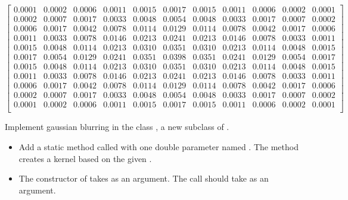 \documentclass{book}
\begin{document}
{\footnotesize{$$
\begin{bmatrix}
0.0001 & 0.0002 & 0.0006 & 0.0011 & 0.0015 & 0.0017 & 0.0015 & 0.0011 & 0.0006 & 0.0002 & 0.0001\\
0.0002 & 0.0007 & 0.0017 & 0.0033 & 0.0048 & 0.0054 & 0.0048 & 0.0033 & 0.0017 & 0.0007 & 0.0002\\
0.0006 & 0.0017 & 0.0042 & 0.0078 & 0.0114 & 0.0129 & 0.0114 & 0.0078 & 0.0042 & 0.0017 & 0.0006\\
0.0011 & 0.0033 & 0.0078 & 0.0146 & 0.0213 & 0.0241 & 0.0213 & 0.0146 & 0.0078 & 0.0033 & 0.0011\\
0.0015 & 0.0048 & 0.0114 & 0.0213 & 0.0310 & 0.0351 & 0.0310 & 0.0213 & 0.0114 & 0.0048 & 0.0015\\
0.0017 & 0.0054 & 0.0129 & 0.0241 & 0.0351 & 0.0398 & 0.0351 & 0.0241 & 0.0129 & 0.0054 & 0.0017\\
0.0015 & 0.0048 & 0.0114 & 0.0213 & 0.0310 & 0.0351 & 0.0310 & 0.0213 & 0.0114 & 0.0048 & 0.0015\\
0.0011 & 0.0033 & 0.0078 & 0.0146 & 0.0213 & 0.0241 & 0.0213 & 0.0146 & 0.0078 & 0.0033 & 0.0011\\
0.0006 & 0.0017 & 0.0042 & 0.0078 & 0.0114 & 0.0129 & 0.0114 & 0.0078 & 0.0042 & 0.0017 & 0.0006\\
0.0002 & 0.0007 & 0.0017 & 0.0033 & 0.0048 & 0.0054 & 0.0048 & 0.0033 & 0.0017 & 0.0007 & 0.0002\\
0.0001 & 0.0002 & 0.0006 & 0.0011 & 0.0015 & 0.0017 & 0.0015 & 0.0011 & 0.0006 & 0.0002 & 0.0001\\
\end{bmatrix}
$$}}

\begin{exercise}
Implement gaussian blurring in the class , a new subclass of .
\begin{itemize}
  \item  Add a static method called  with one double parameter named . The method creates a kernel based on the given .
  \item The constructor of  takes  as an argument. The  call should take  as an argument.
\end{itemize}
\end{exercise}
\end{document}
